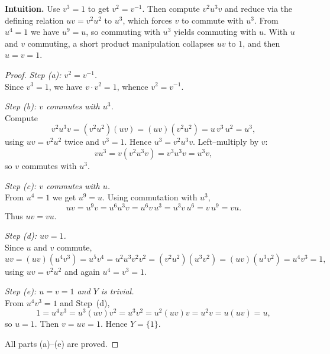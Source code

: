 \documentclass[12pt]{article}
\theoremstyle{definition}
\begin{document}
\dotfill

\noindent
\textbf{Intuition.}
Use $v^{3}=1$ to get $v^{2}=v^{-1}$. Then compute $v^{2}u^{3}v$ and reduce via the defining relation
$uv=v^{2}u^{2}$ to $u^{3}$, which forces $v$ to commute with $u^{3}$. From $u^{4}=1$ we have $u^{9}=u$,
so commuting with $u^{3}$ yields commuting with $u$. With $u$ and $v$ commuting, a short product
manipulation collapses $uv$ to $1$, and then $u=v=1$.

\dotfill

\begin{proof}
\noindent\emph{Step (a): $v^{2}=v^{-1}$.}\\

\noindent
Since $v^{3}=1$, we have $v\cdot v^{2}=1$, whence $v^{2}=v^{-1}$.

\dotfill

\noindent\emph{Step (b): $v$ commutes with $u^{3}$.}\\

\noindent
Compute
\[
v^{2}u^{3}v=(v^{2}u^{2})(uv)=(uv)(v^{2}u^{2})=u\,v^{3}\,u^{2}=u^{3},
\]
using $uv=v^{2}u^{2}$ twice and $v^{3}=1$. Hence $u^{3}=v^{2}u^{3}v$. Left–multiply by $v$:
\[
vu^{3}=v(v^{2}u^{3}v)=v^{3}u^{3}v=u^{3}v,
\]
so $v$ commutes with $u^{3}$.

\dotfill

\noindent\emph{Step (c): $v$ commutes with $u$.}\\

\noindent
From $u^{4}=1$ we get $u^{9}=u$. Using commutation with $u^{3}$,
\[
uv=u^{9}v=u^{6}u^{3}v=u^{6}v\,u^{3}=u^{3}v\,u^{6}=v\,u^{9}=vu.
\]
Thus $uv=vu$.

\dotfill

\noindent\emph{Step (d): $uv=1$.}\\

\noindent
Since $u$ and $v$ commute,
\[
uv=(uv)(u^{4}v^{3})=u^{5}v^{4}=u^{2}u^{3}v^{2}v^{2}=(v^{2}u^{2})(u^{3}v^{2})=(uv)(u^{3}v^{2})
=u^{4}v^{3}=1,
\]
using $uv=v^{2}u^{2}$ and again $u^{4}=v^{3}=1$.

\dotfill

\noindent\emph{Step (e): $u=v=1$ and $Y$ is trivial.}\\

\noindent
From $u^{4}v^{3}=1$ and Step~(d),
\[
1=u^{4}v^{3}=u^{3}(uv)v^{2}=u^{3}v^{2}=u^{2}(uv)v=u^{2}v=u(uv)=u,
\]
so $u=1$. Then $v=uv=1$. Hence $Y=\{1\}$.

\dotfill

All parts (a)–(e) are proved.
\end{proof}
\end{document}
